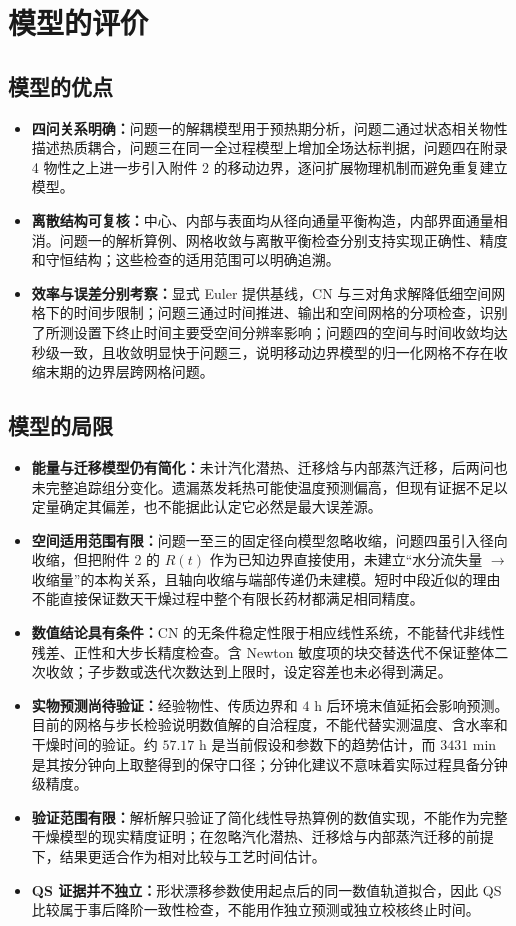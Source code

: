 \section{模型的评价}

\subsection{模型的优点}
\begin{itemize}
  \item \textbf{四问关系明确：}问题一的解耦模型用于预热期分析，问题二通过状态相关物性描述热质耦合，问题三在同一全过程模型上增加全场达标判据，问题四在附录 4 物性之上进一步引入附件 2 的移动边界，逐问扩展物理机制而避免重复建立模型。
  \item \textbf{离散结构可复核：}中心、内部与表面均从径向通量平衡构造，内部界面通量相消。问题一的解析算例、网格收敛与离散平衡检查分别支持实现正确性、精度和守恒结构；这些检查的适用范围可以明确追溯。
  \item \textbf{效率与误差分别考察：}显式 Euler 提供基线，CN 与三对角求解降低细空间网格下的时间步限制；问题三通过时间推进、输出和空间网格的分项检查，识别了所测设置下终止时间主要受空间分辨率影响；问题四的空间与时间收敛均达秒级一致，且收敛明显快于问题三，说明移动边界模型的归一化网格不存在收缩末期的边界层跨网格问题。
\end{itemize}

\subsection{模型的局限}
\begin{itemize}
  \item \textbf{能量与迁移模型仍有简化：}未计汽化潜热、迁移焓与内部蒸汽迁移，后两问也未完整追踪组分变化。遗漏蒸发耗热可能使温度预测偏高，但现有证据不足以定量确定其偏差，也不能据此认定它必然是最大误差源。
  \item \textbf{空间适用范围有限：}问题一至三的固定径向模型忽略收缩，问题四虽引入径向收缩，但把附件 2 的 $R(t)$ 作为已知边界直接使用，未建立“水分流失量 $\to$ 收缩量”的本构关系，且轴向收缩与端部传递仍未建模。短时中段近似的理由不能直接保证数天干燥过程中整个有限长药材都满足相同精度。
  \item \textbf{数值结论具有条件：}CN 的无条件稳定性限于相应线性系统，不能替代非线性残差、正性和大步长精度检查。含 Newton 敏度项的块交替迭代不保证整体二次收敛；子步数或迭代次数达到上限时，设定容差也未必得到满足。
  \item \textbf{实物预测尚待验证：}经验物性、传质边界和 $4$ h 后环境末值延拓会影响预测。目前的网格与步长检验说明数值解的自洽程度，不能代替实测温度、含水率和干燥时间的验证。约 $57.17$ h 是当前假设和参数下的趋势估计，而 $3431$ min 是其按分钟向上取整得到的保守口径；分钟化建议不意味着实际过程具备分钟级精度。
  \item \textbf{验证范围有限：}解析解只验证了简化线性导热算例的数值实现，不能作为完整干燥模型的现实精度证明；在忽略汽化潜热、迁移焓与内部蒸汽迁移的前提下，结果更适合作为相对比较与工艺时间估计。
  \item \textbf{QS 证据并不独立：}形状漂移参数使用起点后的同一数值轨道拟合，因此 QS 比较属于事后降阶一致性检查，不能用作独立预测或独立校核终止时间。
\end{itemize}

